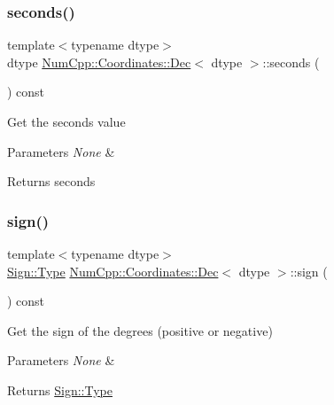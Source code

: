 \subsubsection{\texorpdfstring{seconds()}{seconds()}}
{\footnotesize\ttfamily template$<$typename dtype$>$ \\
dtype \mbox{\hyperlink{class_num_cpp_1_1_coordinates_1_1_dec}{Num\+Cpp\+::\+Coordinates\+::\+Dec}}$<$ dtype $>$\+::seconds (\begin{DoxyParamCaption}{ }\end{DoxyParamCaption}) const\hspace{0.3cm}{\ttfamily [inline]}}

Get the seconds value


\begin{DoxyParams}{Parameters}
{\em None} & \\
\hline
\end{DoxyParams}
\begin{DoxyReturn}{Returns}
seconds 
\end{DoxyReturn}
\mbox{\label{class_num_cpp_1_1_coordinates_1_1_dec_a66811b54110025749c34ebfcaf9db8b5}} 
\subsubsection{\texorpdfstring{sign()}{sign()}}
{\footnotesize\ttfamily template$<$typename dtype$>$ \\
\mbox{\hyperlink{struct_num_cpp_1_1_coordinates_1_1_sign_a6ef8423d5e83675773c2d4f32490e04b}{Sign\+::\+Type}} \mbox{\hyperlink{class_num_cpp_1_1_coordinates_1_1_dec}{Num\+Cpp\+::\+Coordinates\+::\+Dec}}$<$ dtype $>$\+::sign (\begin{DoxyParamCaption}{ }\end{DoxyParamCaption}) const\hspace{0.3cm}{\ttfamily [inline]}}

Get the sign of the degrees (positive or negative)


\begin{DoxyParams}{Parameters}
{\em None} & \\
\hline
\end{DoxyParams}
\begin{DoxyReturn}{Returns}
\mbox{\hyperlink{struct_num_cpp_1_1_coordinates_1_1_sign_a6ef8423d5e83675773c2d4f32490e04b}{Sign\+::\+Type}} 
\end{DoxyReturn}
\mbox{\label{class_num_cpp_1_1_coordinates_1_1_dec_a1e98421fc7e41424d706bb507d6813dd}} 
